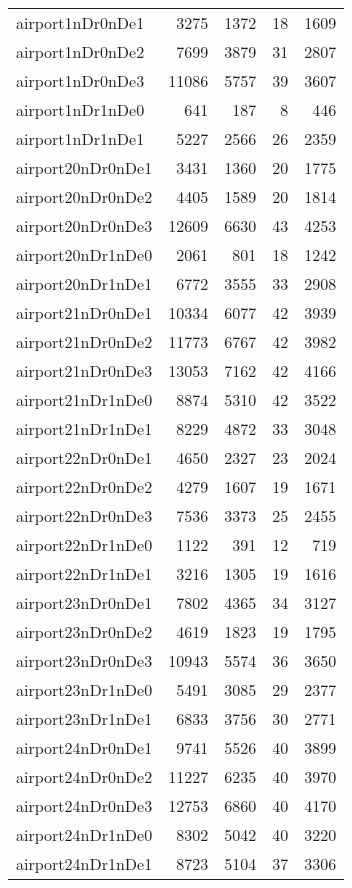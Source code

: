 \begin{longtable}{lrrrr}
airport1nDr0nDe1 & 3275 & 1372 & 18 & 1609 \\
airport1nDr0nDe2 & 7699 & 3879 & 31 & 2807 \\
airport1nDr0nDe3 & 11086 & 5757 & 39 & 3607 \\
airport1nDr1nDe0 & 641 & 187 & 8 & 446 \\
airport1nDr1nDe1 & 5227 & 2566 & 26 & 2359 \\
airport20nDr0nDe1 & 3431 & 1360 & 20 & 1775 \\
airport20nDr0nDe2 & 4405 & 1589 & 20 & 1814 \\
airport20nDr0nDe3 & 12609 & 6630 & 43 & 4253 \\
airport20nDr1nDe0 & 2061 & 801 & 18 & 1242 \\
airport20nDr1nDe1 & 6772 & 3555 & 33 & 2908 \\
airport21nDr0nDe1 & 10334 & 6077 & 42 & 3939 \\
airport21nDr0nDe2 & 11773 & 6767 & 42 & 3982 \\
airport21nDr0nDe3 & 13053 & 7162 & 42 & 4166 \\
airport21nDr1nDe0 & 8874 & 5310 & 42 & 3522 \\
airport21nDr1nDe1 & 8229 & 4872 & 33 & 3048 \\
airport22nDr0nDe1 & 4650 & 2327 & 23 & 2024 \\
airport22nDr0nDe2 & 4279 & 1607 & 19 & 1671 \\
airport22nDr0nDe3 & 7536 & 3373 & 25 & 2455 \\
airport22nDr1nDe0 & 1122 & 391 & 12 & 719 \\
airport22nDr1nDe1 & 3216 & 1305 & 19 & 1616 \\
airport23nDr0nDe1 & 7802 & 4365 & 34 & 3127 \\
airport23nDr0nDe2 & 4619 & 1823 & 19 & 1795 \\
airport23nDr0nDe3 & 10943 & 5574 & 36 & 3650 \\
airport23nDr1nDe0 & 5491 & 3085 & 29 & 2377 \\
airport23nDr1nDe1 & 6833 & 3756 & 30 & 2771 \\
airport24nDr0nDe1 & 9741 & 5526 & 40 & 3899 \\
airport24nDr0nDe2 & 11227 & 6235 & 40 & 3970 \\
airport24nDr0nDe3 & 12753 & 6860 & 40 & 4170 \\
airport24nDr1nDe0 & 8302 & 5042 & 40 & 3220 \\
airport24nDr1nDe1 & 8723 & 5104 & 37 & 3306 \\

\end{longtable}
